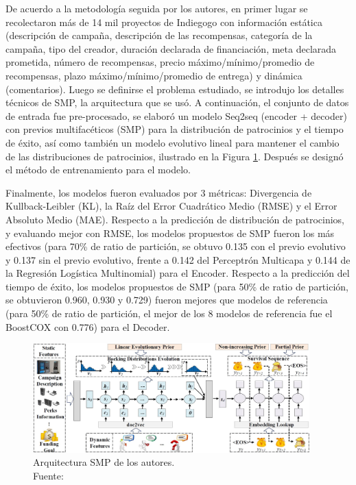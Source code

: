 De acuerdo a la metodología seguida por los autores, en primer lugar se recolectaron más de 14 mil proyectos de Indiegogo con información estática (descripción de campaña, descripción de las recompensas, categoría de la campaña, tipo del creador, duración declarada de financiación, meta declarada prometida, número de recompensas, precio máximo/mínimo/promedio de recompensas, plazo máximo/mínimo/promedio de entrega) y dinámica (comentarios). Luego se definirse el problema estudiado, se introdujo los detalles técnicos de SMP, la arquitectura que se usó. A continuación, el conjunto de datos de entrada fue pre-procesado, se elaboró un modelo Seq2seq (encoder + decoder) con previos multifacéticos (SMP) para la distribución de patrocinios y el tiempo de éxito, así como también un modelo evolutivo lineal para mantener el cambio de las distribuciones de patrocinios, ilustrado en la Figura \ref{2:fig124}. Después se designó el método de entrenamiento para el modelo.

Finalmente, los modelos fueron evaluados por 3 métricas: Divergencia de Kullback-Leibler (KL), la Raíz del Error Cuadrático Medio (RMSE) y el Error Absoluto Medio (MAE). Respecto a la predicción de distribución de patrocinios, y evaluando mejor con RMSE, los modelos propuestos de SMP fueron los más efectivos (para 70\% de ratio de partición, se obtuvo 0.135 con el previo evolutivo y 0.137 sin el previo evolutivo, frente a 0.142 del Perceptrón Multicapa y 0.144 de la Regresión Logística Multinomial) para el Encoder.
Respecto a la predicción del tiempo de éxito, los modelos propuestos de SMP (para 50\% de ratio de partición, se obtuvieron 0.960, 0.930 y 0.729) fueron mejores que modelos de referencia (para 50\% de ratio de partición, el mejor de los 8 modelos de referencia fue el BoostCOX con 0.776) para el Decoder.

\begin{figure}[!ht]
	\begin{center}
		\includegraphics[width=0.95\textwidth]{2/figures/jin2019.jpg}
		\caption[Arquitectura SMP de los autores]{Arquitectura SMP de los autores.\\
			Fuente: \cite{pr_jin2019dayssuccess}}
		\label{2:fig124}
	\end{center}
\end{figure}

